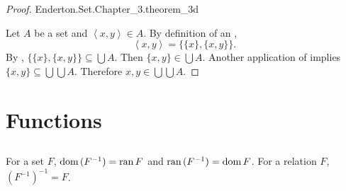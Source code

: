 \documentclass{report}
\begin{document}
\begin{proof}

    {Enderton.Set.Chapter\_3.theorem\_3d}

  Let $A$ be a set and $\left< x, y \right> \in A$.
  By definition of an ,
    $$\left< x, y \right> = \{\{x\}, \{x, y\}\}.$$
  By , $\{\{x\}, \{x, y\}\} \subseteq \bigcup A$.
  Then $\{x, y\} \in \bigcup A$.
  Another application of  implies
    $\{x, y\} \subseteq \bigcup\bigcup A$.
  Therefore $x, y \in \bigcup\bigcup A$.

\end{proof}

\section{Functions}%
\label{sec:functions}

\subsection{}%
\label{sub:theorem-3e}

\begin{theorem}[3E]

  For a set $F$, $\mathop{\text{dom}}{(F^{-1})} = \mathop{\text{ran}}{F}$ and $\mathop{\text{ran}}{(F^{-1})} = \mathop{\text{dom}}{F}$.
  For a relation $F$, $(F^{-1})^{-1} = F$.

\end{theorem}
\end{document}
